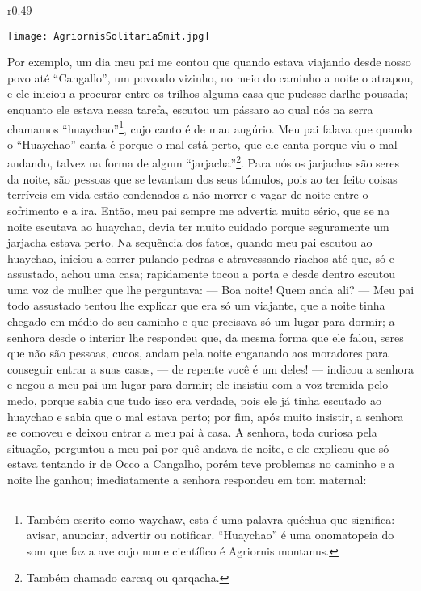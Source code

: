 \ifdefined\EnableIncludeImages
\begin{wrapfigure}{r}{0.49\textwidth}
  \begin{center}
  \vspace{-20pt}
    \texttt{[image: AgriornisSolitariaSmit.jpg]}
  \end{center}
  \vspace{-20pt}
\end{wrapfigure}
\fi
Por exemplo, um dia meu pai me contou que quando estava viajando desde nosso povo até ``Cangallo'', um povoado vizinho, no meio do caminho a noite o atrapou, e ele iniciou a procurar entre os trilhos alguma casa que pudesse darlhe pousada; enquanto ele estava nessa tarefa, escutou um pássaro ao qual nós na serra chamamos ``huaychao''\footnote{Também escrito como waychaw, esta é uma palavra quéchua que significa: avisar, anunciar, advertir ou notificar. ``Huaychao'' é uma onomatopeia do som que faz a ave cujo nome científico é Agriornis montanus.}, cujo canto é de mau augúrio.
Meu pai falava que quando o ``Huaychao'' canta é porque o mal está perto, que ele canta porque viu o mal andando, talvez na forma de algum ``jarjacha''\footnote{Também chamado carcaq ou qarqacha.}. Para nós os jarjachas são seres da noite, são pessoas que se levantam dos seus túmulos, pois ao ter feito coisas terríveis em vida estão condenados a não morrer e vagar de noite entre o sofrimento e a ira. 
Então, meu pai sempre me advertia muito sério, que se na noite escutava ao huaychao, devia ter muito cuidado porque seguramente um jarjacha estava perto. 
Na sequência dos fatos, quando meu pai escutou ao huaychao, iniciou a correr pulando pedras e atravessando riachos até que, só e assustado, achou uma casa; rapidamente tocou a porta e desde dentro escutou uma voz de mulher que lhe perguntava: 
--- Boa noite! Quem anda ali? ---
Meu pai todo assustado tentou lhe explicar que era só um viajante, que a noite tinha chegado em médio do seu caminho e que precisava só um lugar para dormir; a senhora desde o interior lhe respondeu que, da mesma forma que ele falou, seres que não são pessoas, cucos, andam pela noite enganando aos moradores para conseguir entrar a suas casas, 
--- de repente você é um deles! --- indicou a senhora e negou a meu pai um lugar para dormir; ele insistiu com a voz tremida pelo medo, porque sabia que tudo isso era verdade, pois ele já tinha escutado ao huaychao e sabia que o mal estava perto; por fim, após muito insistir, a senhora se comoveu e deixou entrar a meu pai à casa. 
A senhora, toda curiosa pela situação, perguntou a meu pai por quê andava de noite, e ele explicou que só estava tentando ir de Occo a Cangalho, porém teve problemas no caminho e a noite lhe ganhou; imediatamente a senhora respondeu em tom maternal: 
